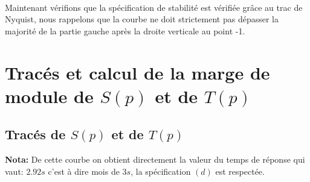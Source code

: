 \documentclass[12pt, a4paper, openany]{report}
\begin{document}
   \paragraph{}
   Maintenant vérifions que la spécification de stabilité est vérifiée grâce au trac de Nyquist, nous rappelons que la courbe ne doit strictement pas dépasser la majorité de la partie gauche après la droite verticale au point -1.\\
   
   \begin{center}
     \label{fig16}
 \end{center}
 
  \section{ Tracés et calcul de la marge de module de $S(p)$\hspace{1mm} et de \hspace{1mm}$T(p)$}
  
   \subsection{ Tracés de $S(p)$\hspace{1mm} et de \hspace{1mm}$T(p)$}
   
   \begin{center}
     \label{fig17}
 \end{center}
 

\textbf{Nota:} De cette courbe on obtient directement la valeur du temps de réponse qui vaut:\hspace{1mm} $2.92 s$\hspace{1mm} c'est à dire mois de\hspace{1mm} $3 s$, la spécification\hspace{1mm} $(d) $ \hspace{1mm}est respectée.   

 
\end{document}
